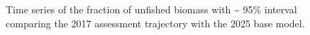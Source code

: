 \documentclass[
]{scrartcl}
\begin{document}
\begin{figure}


\caption{\label{fig-bridge25-comp4}Time series of the fraction of
unfished biomass with \textasciitilde{} 95\% interval comparing the 2017
assessment trajectory with the 2025 base model.}

\end{figure}%
\end{document}
